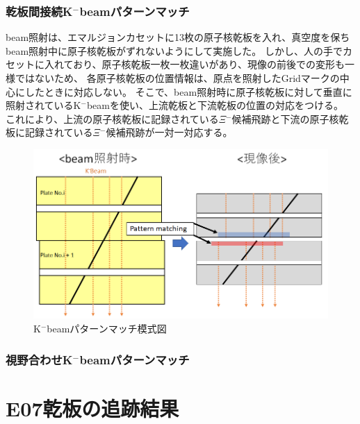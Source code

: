 \documentclass[12pt,a4paper]{jarticle}
\begin{document}
\subsubsection{乾板間接続K$^-$beamパターンマッチ}
beam照射は、エマルジョンカセットに13枚の原子核乾板を入れ、真空度を保ちbeam照射中に原子核乾板がずれないようにして実施した。
しかし、人の手でカセットに入れており、原子核乾板一枚一枚違いがあり、現像の前後での変形も一様ではないため、
各原子核乾板の位置情報は、原点を照射したGridマークの中心にしたときに対応しない。
そこで、beam照射時に原子核乾板に対して垂直に照射されているK$^-$beamを使い、上流乾板と下流乾板の位置の対応をつける。
これにより、上流の原子核乾板に記録されている$\Xi$$^-$候補飛跡と下流の原子核乾板に記録されている$\Xi$$^-$候補飛跡が一対一対応する。
\begin{figure}[htbp]
  \centering
     \includegraphics[width=120mm]{beam_mosikizu.png}
  \caption{K$^-$beamパターンマッチ模式図\label{fig:beam_mosikizu}}
\end{figure}
\subsubsection{視野合わせK$^-$beamパターンマッチ}


\newpage
\section{E07乾板の追跡結果}
\end{document}
